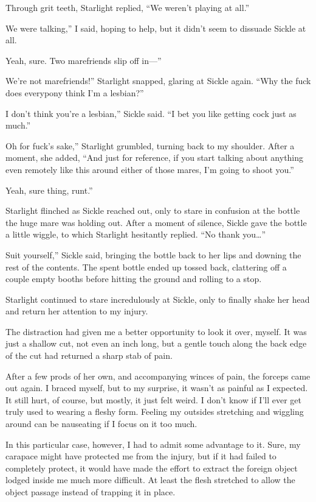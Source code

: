 Through grit teeth, Starlight replied, “We weren’t playing at all.”

\leavevmode{}We were talking,” I said, hoping to help, but it didn’t seem to dissuade Sickle at all.

\leavevmode{}Yeah, sure. Two marefriends slip off in—”

\leavevmode{}We’re not marefriends!” Starlight snapped, glaring at Sickle again. “Why the fuck does everypony think I’m a lesbian?”

\leavevmode{}I don’t think you’re a lesbian,” Sickle said. “I bet you like getting cock just as much.”

\leavevmode{}Oh for fuck’s sake,” Starlight grumbled, turning back to my shoulder. After a moment, she added, “And just for reference, if you start talking about anything even remotely like this around either of those mares, I’m going to shoot you.”

\leavevmode{}Yeah, sure thing, runt.”

Starlight flinched as Sickle reached out, only to stare in confusion at the bottle the huge mare was holding out. After a moment of silence, Sickle gave the bottle a little wiggle, to which Starlight hesitantly replied. “No thank you…”

\leavevmode{}Suit yourself,” Sickle said, bringing the bottle back to her lips and downing the rest of the contents. The spent bottle ended up tossed back, clattering off a couple empty booths before hitting the ground and rolling to a stop.

Starlight continued to stare incredulously at Sickle, only to finally shake her head and return her attention to my injury.

The distraction had given me a better opportunity to look it over, myself. It was just a shallow cut, not even an inch long, but a gentle touch along the back edge of the cut had returned a sharp stab of pain.

After a few prods of her own, and accompanying winces of pain, the forceps came out again. I braced myself, but to my surprise, it wasn’t as painful as I expected. It still hurt, of course, but mostly, it just felt weird. I don’t know if I’ll ever get truly used to wearing a fleshy form. Feeling my outsides stretching and wiggling around can be nauseating if I focus on it too much.

In this particular case, however, I had to admit some advantage to it. Sure, my carapace might have protected me from the injury, but if it had failed to completely protect, it would have made the effort to extract the foreign object lodged inside me much more difficult. At least the flesh stretched to allow the object passage instead of trapping it in place.

